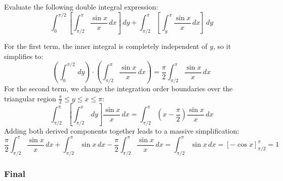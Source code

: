 \begin{questions}
\question
Evaluate the following double integral expression:
\[ \int_{0}^{\pi/2} \left[ \int_{\pi/2}^{\pi} \frac{\sin x}{x} \,dx \right] \,dy + \int_{\pi/2}^{\pi} \left[ \int_{y}^{\pi} \frac{\sin x}{x} \,dx \right] \,dy \]
\begin{solution}
For the first term, the inner integral is completely independent of $y$, so it simplifies to:
\[ \left( \int_{0}^{\pi/2} \,dy \right) \cdot \left( \int_{\pi/2}^{\pi} \frac{\sin x}{x} \,dx \right) = \frac{\pi}{2} \int_{\pi/2}^{\pi} \frac{\sin x}{x} \,dx \]
For the second term, we change the integration order boundaries over the triangular region $\frac{\pi}{2} \le y \le x \le \pi$:
\[ \int_{\pi/2}^{\pi} \left[ \int_{\pi/2}^{x} \,dy \right] \frac{\sin x}{x} \,dx = \int_{\pi/2}^{\pi} \left(x - \frac{\pi}{2}\right) \frac{\sin x}{x} \,dx \]
Adding both derived components together leads to a massive simplification:
\[ \frac{\pi}{2} \int_{\pi/2}^{\pi} \frac{\sin x}{x} \,dx + \int_{\pi/2}^{\pi} \sin x \,dx - \frac{\pi}{2} \int_{\pi/2}^{\pi} \frac{\sin x}{x} \,dx = \int_{\pi/2}^{\pi} \sin x \,dx = [-\cos x]_{\pi/2}^{\pi} = 1 \]
\end{solution}

\end{questions}

\subsubsection*{Final}

